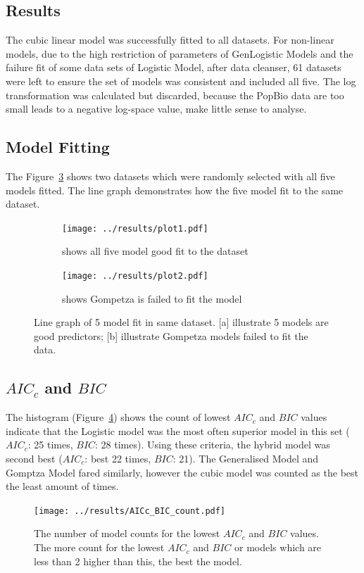 \documentclass[a4paper]{report}
\begin{document}
\begin{linenumbers}
    \section{Results}
    The cubic linear model was successfully fitted to all datasets. For non-linear models, due to the high restriction of parameters of GenLogistic Models and the failure fit of some data sets of Logistic Model, after data cleanser, 61 datasets were left to ensure the set of models was consistent and included all five. The log transformation was calculated but discarded, because the PopBio data are too small leads to a negative log-space value, make little sense to analyse. 
        \subsection{Model Fitting}
        The Figure~\ref{fig:model_fit_plot} shows two datasets which were randomly selected with all five models fitted. The line graph demonstrates how the five model fit to the same dataset. 
        \begin{figure}
            \centering
            \begin{subfigure}[b]{0.45 \textwidth}
                \centering
                \texttt{[image: ../results/plot1.pdf]}
                \caption{shows all five model good fit to the dataset}
                \label{modelfitting_1}
            \end{subfigure}
            \hfill
            \begin{subfigure}[b]{0.45 \textwidth}
                \centering
                \texttt{[image: ../results/plot2.pdf]}
                \caption{shows Gompetza is failed to fit the model}
                \label{modelfitting_2}
            \end{subfigure}
            \caption{Line graph of 5 model fit in same dataset. [a] illustrate 5 models are good predictors; [b] illustrate Gompetza models failed to fit the data.}
            \label{fig:model_fit_plot}
        \end{figure}

        \subsection{$AIC_c$ and $BIC$}
        The histogram (Figure~\ref{fig:AIC_c and BIC count}) shows the count of lowest $AIC_c$ and $BIC$ values indicate that the Logistic model was the most often superior model in this set ($AIC_c$: 25 times, $BIC$: 28 times). Using these criteria, the hybrid model was second best ($AIC_c$: best 22 times, $BIC$: 21). The Generalised Model and Gomptza Model fared similarly, however the cubic model was counted as the best the least amount of times. 
        \begin{figure}
            \centering
            \texttt{[image: ../results/AICc\_BIC\_count.pdf]}
            \caption{The number of model counts for the lowest $AIC_c$ and $BIC$ values. The more count for the lowest $AIC_c$ and $BIC$ or models which are less than 2 higher than this, the best the model.}
            \label{fig:AIC_c and BIC count}
        \end{figure}


\end{linenumbers}
\end{document}

